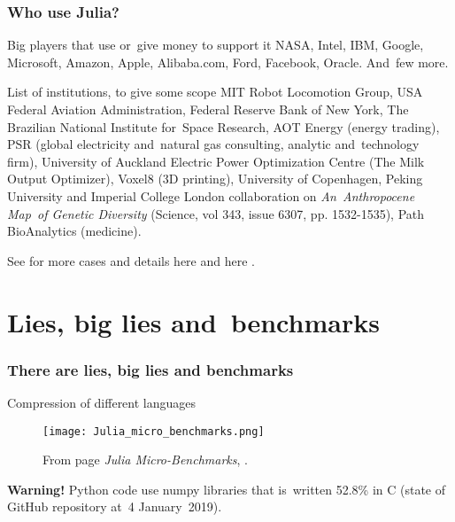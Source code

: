 \documentclass{beamer}  %
\begin{document}
\begin{frame}
  \frametitle{Who use Julia?}

  \begin{block}{Big players that use or~give money to support it}
    NASA, Intel, IBM, Google, Microsoft, Amazon, Apple, Alibaba.com,
    Ford, Facebook, Oracle. And~few more.
  \end{block}
  
  \begin{block}{List of institutions, to give some scope}
    MIT Robot Locomotion Group, USA Federal Aviation Administration,
    Federal Reserve Bank of New York, The Brazilian National Institute
    for~Space Research, AOT Energy (energy trading), PSR (global
    electricity and~natural gas consulting, analytic and~technology
    firm), University of Auckland Electric Power Optimization Centre
    (The Milk Output Optimizer), Voxel8 (3D printing), University of
    Copenhagen, Peking University and Imperial College London
    collaboration on \emph{An~Anthropocene Map~of Genetic Diversity}
    (Science, vol 343, issue 6307, pp. 1532-1535), Path BioAnalytics
    (medicine).
  \end{block}

  \begin{block}{}
    See for more cases and details here
     and here
    .
  \end{block}

\end{frame}





\section[]{Lies, big lies and~benchmarks}




\begin{frame}
  \frametitle{There are lies, big lies and benchmarks}

  \begin{block}{Compression of different languages}
    \begin{figure}
      \centering

      \texttt{[image: Julia\_micro\_benchmarks.png]}
      \caption{From page \emph{Julia Micro-Benchmarks},
        .}
    \end{figure}

    \textbf{Warning!} Python code use numpy libraries that is~written
    52.8\% in C (state of GitHub repository at~4 January~2019).
  \end{block}
  
\end{frame}
\end{document}
